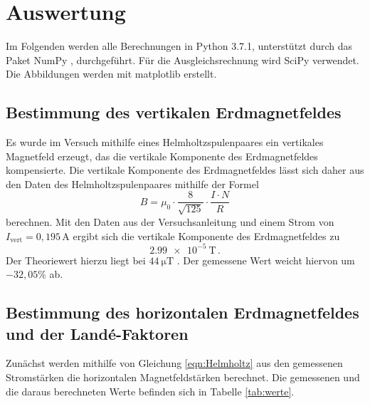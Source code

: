 \newpage
\section{Auswertung}
\label{sec:Auswertung}
Im Folgenden werden alle Berechnungen in Python 3.7.1, unterstützt durch das
Paket NumPy \cite{numpy}, durchgeführt. Für die Ausgleichsrechnung wird SciPy
\cite{scipy} verwendet. Die Abbildungen werden mit matplotlib \cite{matplotlib} erstellt.

\subsection{Bestimmung des vertikalen Erdmagnetfeldes}
\label{subsec:vertikal}

Es wurde im Versuch mithilfe eines Helmholtzspulenpaares ein vertikales Magnetfeld
erzeugt, das die vertikale Komponente des Erdmagnetfeldes kompensierte. Die vertikale
Komponente des Erdmagnetfeldes lässt sich daher aus den Daten des Helmholtzspulenpaares
mithilfe der Formel
\begin{equation}
    B= \mu_0 \cdot  \frac{8}{\sqrt {125}}\cdot \frac{I\cdot N}{R}
    \label{eqn:Helmholtz}
\end{equation}
berechnen. Mit den Daten aus der Versuchsanleitung \cite{Versuchsanleitung} und einem Strom von
$I_{\text{vert}}=0{,}195\,$A ergibt sich die vertikale Komponente des Erdmagnetfeldes zu
\begin{equation*}
  \SI{2.99e-5}{\tesla}\,.
\end{equation*}
Der Theoriewert hierzu liegt bei $\SI{44}{\micro\tesla}$ \cite{erde}. Der gemessene Wert
weicht hiervon um $-32{,}05\%$ ab.

\subsection{Bestimmung des horizontalen Erdmagnetfeldes und der Landé-Faktoren}
\label{subsec:horizontal}

Zunächst werden mithilfe von Gleichung \eqref{eqn:Helmholtz} aus den gemessenen Stromstärken
die horizontalen Magnetfeldstärken berechnet. Die gemessenen und die daraus berechneten Werte befinden sich
in Tabelle \ref{tab:werte}.

